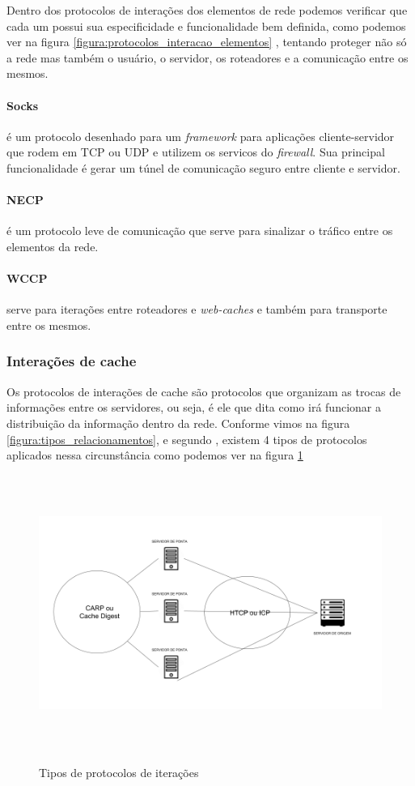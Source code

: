 Dentro dos protocolos de intera\c{c}\~oes dos elementos de rede podemos verificar que cada um possui sua especificidade e funcionalidade bem definida, como podemos ver na figura \ref{figura:protocolos_interacao_elementos} , tentando proteger n\~ao s\'o a rede mas tamb\'em o usu\'ario, o servidor, os roteadores e a comunica\c{c}\~ao entre os mesmos.
\paragraph{Socks} \'e um protocolo desenhado para um \textit{framework} para aplica\c{c}\~oes cliente-servidor que rodem em TCP ou UDP e utilizem os servi{c}os do \textit{firewall}. Sua principal funcionalidade \'e gerar um t\'unel de comunica\c{c}\~ao seguro entre cliente e servidor.
\paragraph{NECP} \'e um protocolo leve de comunica\c{c}\~ao que serve para sinalizar o tr\'afico entre os elementos da rede.
\paragraph{WCCP} serve para itera\c{c}\~oes entre roteadores e \textit{web-caches}	e tamb\'em para transporte entre os mesmos.


\subsubsection{Intera\c{c}\~oes de cache}

Os protocolos de intera\c{c}\~oes de cache s\~ao protocolos que organizam as trocas de informa\c{c}\~oes entre os servidores, ou seja, \'e ele que dita como ir\'a funcionar a distribui\c{c}\~ao da informa\c{c}\~ao dentro da rede.
 Conforme vimos na figura \ref{figura:tipos_relacionamentos}, e segundo \cite{pathan2007taxonomy}, existem 4 tipos de protocolos aplicados nessa circunst\^ancia como podemos ver na figura \ref{figura:protocolos_interacao_cache}
\begin{figure}[H]
\caption{Tipos de protocolos de itera\c{c}\~oes}
\includegraphics[height=9cm]{Figuras/protocolos_interacoes_cache.png} 
\label{figura:protocolos_interacao_cache}
\end{figure}

